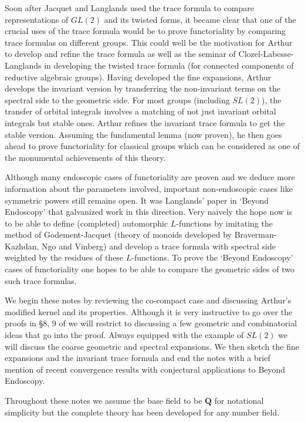 \documentclass{ims9x6}
\def\Q{\mathbf Q}
\begin{document}
	Soon after Jacquet and Langlands \cite{MR0401654} used the trace formula to compare representations of $GL(2)$ and its twisted forms, it became clear that one of the crucial uses of the trace formula would be to prove functoriality by comparing trace formulas on different groups. This could well be the motivation for Arthur to develop and refine the trace formula as well as the seminar of Clozel-Labesse-Langlands in developing the twisted trace formula (for connected components of reductive algebraic groups). Having developed the fine expansions, Arthur develops the invariant version by transferring the non-invariant terms on the spectral side to the geometric side. For most groups (including $SL(2)$), the transfer of orbital integrals involves a matching of not just invariant orbital integrals but stable ones. Arthur refines the invariant trace formula to get the stable version. Assuming the fundamental lemma (now proven), he then goes ahead to prove functoriality for classical groups which can be considered as one of the monumental achievements of this theory. 

	Although many endoscopic cases of functoriality are proven and we deduce more information about the parameters involved, important non-endoscopic cases like symmetric powers still remains open. It was Langlands' paper in `Beyond Endoscopy' \cite{MR2058622} that galvanized work in this direction. Very naively the hope now is to be able to define (completed) automorphic $L$-functions by imitating the method of Godement-Jacquet (theory of monoids developed by Braverman-Kazhdan, Ngo and Vinberg) and develop a trace formula with spectral side weighted by the residues of these $L$-functions. To prove the `Beyond Endoscopy' cases of functoriality one hopes to be able to compare the geometric sides of two such trace formulas. 
	
	We begin these notes by reviewing the co-compact case and discussing Arthur's modified kernel and its properties. Although it is very instructive to go over the proofs in \S 8, 9 of \cite{clay} we will restrict to discussing a few geometric and combinatorial ideas that go into the proof. Always equipped with the example of $SL(2)$ we will discuss the coarse geometric and spectral expansions. We then sketch the fine expansions and the invariant trace formula and end the notes with a brief mention of recent convergence results with conjectural applications to Beyond Endoscopy. 
	
	Throughout these notes we assume the base field to be $\Q$ for notational simplicity but the complete theory has been developed for any number field. 
\end{document}
